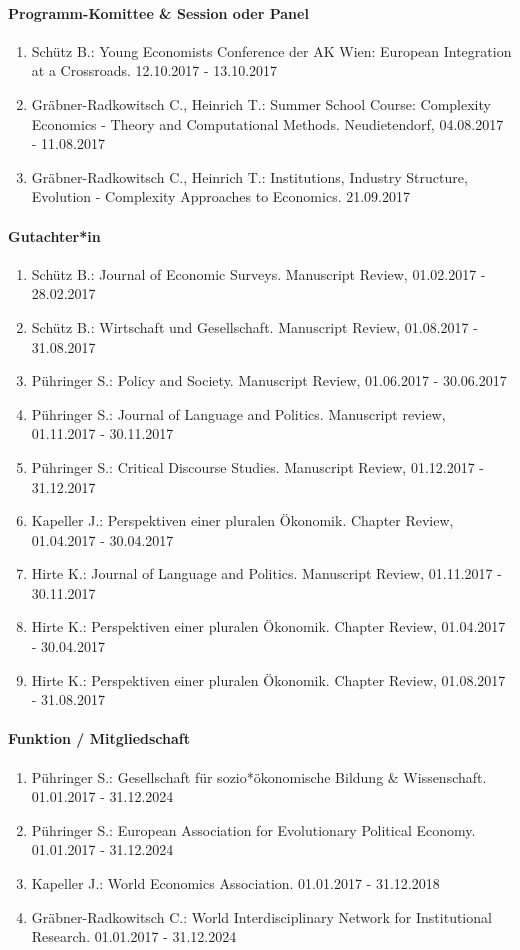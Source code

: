 \paragraph{Programm-Komittee \& Session oder Panel}
\begin{enumerate}[leftmargin=*, labelsep=0.5cm]
\item Schütz B.: Young Economists Conference der AK Wien: European Integration at a Crossroads. 12.10.2017 - 13.10.2017
\item Gräbner-Radkowitsch C., Heinrich T.: Summer School Course: Complexity Economics - Theory and Computational Methods. Neudietendorf, 04.08.2017 - 11.08.2017
\item Gräbner-Radkowitsch C., Heinrich T.: Institutions, Industry Structure, Evolution - Complexity Approaches to Economics. 21.09.2017
\end{enumerate}

\paragraph{Gutachter*in}
\begin{enumerate}[leftmargin=*, labelsep=0.5cm]
\item Schütz B.: Journal of Economic Surveys. Manuscript Review, 01.02.2017 - 28.02.2017
\item Schütz B.: Wirtschaft und Gesellschaft. Manuscript Review, 01.08.2017 - 31.08.2017
\item Pühringer S.: Policy and Society. Manuscript Review, 01.06.2017 - 30.06.2017
\item Pühringer S.: Journal of Language and Politics. Manuscript review, 01.11.2017 - 30.11.2017
\item Pühringer S.: Critical Discourse Studies. Manuscript Review, 01.12.2017 - 31.12.2017
\item Kapeller J.: Perspektiven einer pluralen Ökonomik. Chapter Review, 01.04.2017 - 30.04.2017
\item Hirte K.: Journal of Language and Politics. Manuscript Review, 01.11.2017 - 30.11.2017
\item Hirte K.: Perspektiven einer pluralen Ökonomik. Chapter Review, 01.04.2017 - 30.04.2017
\item Hirte K.: Perspektiven einer pluralen Ökonomik. Chapter Review, 01.08.2017 - 31.08.2017
\end{enumerate}

\paragraph{Funktion / Mitgliedschaft}
\begin{enumerate}[leftmargin=*, labelsep=0.5cm]
\item Pühringer S.: Gesellschaft für sozio*ökonomische Bildung \& Wissenschaft. 01.01.2017 - 31.12.2024
\item Pühringer S.: European Association for Evolutionary Political Economy. 01.01.2017 - 31.12.2024
\item Kapeller J.: World Economics Association. 01.01.2017 - 31.12.2018
\item Gräbner-Radkowitsch C.: World Interdisciplinary Network for Institutional Research. 01.01.2017 - 31.12.2024
\end{enumerate}
